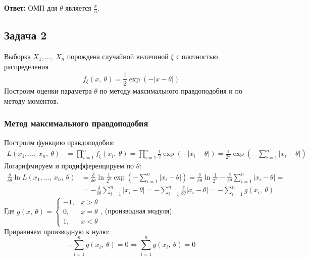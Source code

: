 \documentclass[12pt, a4paper]{article}
\begin{document}
\textbf{Ответ:} ОМП для $\theta$ является $\frac{\overline{x}}{n}$.
\subsection*{Задача 2}
Выборка $X_1,\dots,\ X_n$ порождена случайной величиной $\xi$ с плотностью распределения
\[f_{\xi}(x,\ \theta) = \frac{1}{2} \exp(-|x - \theta|)\]
Построим оценки параметра $\theta$ по методу максимального правдоподобия и по методу моментов.
\subsubsection*{Метод максимального правдоподобия}
Построим функцию правдоподобия:
\begin{equation*}
    \begin{aligned}
        L(x_1,\dots,\ x_n,\ \theta) & = \prod_{i = 1}^{n} f_{\xi}(x_i,\ \theta) = \prod_{i = 1}^{n} \frac{1}{2} \exp\left(-|x_i - \theta|\right) = \frac{1}{2^n} \exp\left(-\sum_{i = 1}^{n}|x_i - \theta|\right)
    \end{aligned}
\end{equation*}
Логарифмируем и продифференцируем по $\theta$:
\begin{equation*}
    \begin{aligned}
        \frac{\delta}{\delta \theta} \ln L(x_1,\dots,\ x_n,\ \theta) & = \frac{\delta}{\delta \theta} \ln \frac{1}{2^n} \exp\left(-\sum_{i = 1}^{n}|x_i - \theta|\right) = \frac{\delta}{\delta \theta} \ln \frac{1}{2^n} - \frac{\delta}{\delta \theta} \sum_{i = 1}^{n}|x_i - \theta| = \\
                                                                     & = -\frac{\delta}{\delta \theta} \sum_{i = 1}^{n}|x_i -\theta| = -\sum_{i = 1}^{n} \frac{\delta}{\delta \theta} |x_i - \theta| = -\sum_{i = 1}^{n} g(x_i,\ \theta)
    \end{aligned}
\end{equation*}
Где $g(x,\ \theta) = \begin{cases}
        -1, & x > \theta \\
        0,  & x = \theta \\
        1,  & x < \theta
    \end{cases}$, (производная модуля).\\
Приравняем производную к нулю:
\begin{equation*}
    -\sum_{i = 1}^{n} g(x_i,\ \theta) = 0\Rightarrow \sum_{i = 1}^{n} g(x_i,\ \theta) = 0
\end{equation*}
\end{document}
